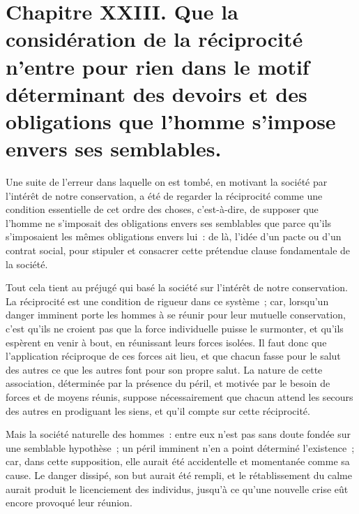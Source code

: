\documentclass[french,twoside]{book} %
\newcommand\chapteropen{} %
\newcommand\chaptercont{} %
\begin{document}
\chapteropen
\chapter[{Chapitre XXIII. Que la considération de la réciprocité n’entre pour rien dans le motif déterminant des devoirs et des obligations que l’homme s’impose envers ses semblables.}]{Chapitre XXIII. Que la considération de la réciprocité n’entre pour rien dans le motif déterminant des devoirs et des obligations que l’homme s’impose envers ses semblables.}\renewcommand{\leftmark}{Chapitre XXIII. Que la considération de la réciprocité n’entre pour rien dans le motif déterminant des devoirs et des obligations que l’homme s’impose envers ses semblables.}


\chaptercont
\noindent Une suite de l’erreur dans laquelle on est tombé, en motivant la société par l’intérêt de notre conservation, a été de regarder la réciprocité comme une condition essentielle de cet ordre des choses, c’est-à-dire, de supposer que l’homme ne s’imposait des obligations envers ses semblables que parce qu’ils s’imposaient les mêmes obligations envers lui : de là, l’idée d’un pacte ou d’un contrat social, pour stipuler et consacrer cette prétendue clause fondamentale de la société.\par
Tout cela tient au préjugé qui basé la société sur l’intérêt de notre conservation. La réciprocité est une condition de rigueur dans ce système ; car, lorsqu’un danger imminent porte les hommes à se réunir pour leur mutuelle conservation, c’est qu’ils ne croient pas que la force individuelle puisse le surmonter, et qu’ils espèrent en venir à bout, en réunissant leurs forces isolées. Il faut donc que l’application réciproque de ces forces ait lieu, et que chacun fasse pour le salut des autres ce que les autres font pour son propre salut. La nature de cette association, déterminée par la présence du péril, et motivée par le besoin de forces et de moyens réunis, suppose nécessairement que chacun attend les secours des autres en prodiguant les siens, et qu’il compte sur cette réciprocité.\par
Mais la société naturelle des hommes : entre eux n’est pas sans doute fondée sur une semblable hypothèse ; un péril imminent n’en a point déterminé l’existence ; car, dans cette supposition, elle aurait été accidentelle et momentanée comme sa cause. Le danger dissipé, son but aurait été rempli, et le rétablissement du calme aurait produit le licenciement des individus, jusqu’à ce qu’une nouvelle crise eût encore provoqué leur réunion.\par
\end{document}
